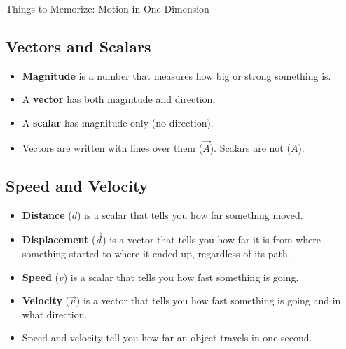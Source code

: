 \documentclass[letterpaper, 12pt]{article}
\begin{document}
	


\begin{center}Things to Memorize: Motion in One Dimension
\end{center}

\subsection*{Vectors and Scalars}
\begin{itemize}
	\item \textbf{Magnitude} is a number that measures how big or strong something is.
	\item A \textbf{vector} has both magnitude and direction.
	\item A \textbf{scalar} has magnitude only (no direction).	
	\item Vectors are written with lines over them ($ \vec{A} $).  Scalars are not ($A$).
\end{itemize}

\subsection*{Speed and Velocity}
\begin{itemize}
	\item \textbf{Distance} ($d$) is a scalar that tells you how far something moved.
	\item \textbf{Displacement} ($\vec{d} $) is a vector that tells you how far it is from where something started to where it ended up, regardless of its path. 
	\item \textbf{Speed} ($v$) is a scalar that tells you how fast something is going.
	\item \textbf{Velocity} ($\vec{v}$) is a vector that tells you how fast something is going and in what direction.
	\item Speed and velocity tell you how far an object travels in one second. 
	
	
\end{itemize}

	
\end{document}
